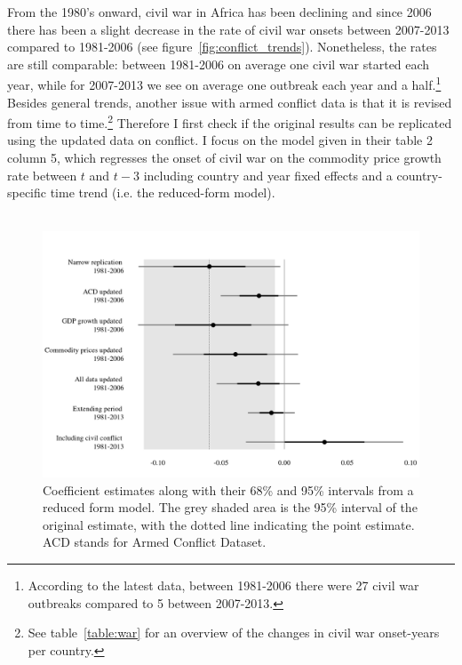 \documentclass[a4paper,11pt]{article}
\begin{document}
From the 1980's onward, civil war in Africa has been declining and since 2006 there has been a slight decrease in the rate of civil war onsets between 2007-2013 compared to 1981-2006 (see figure~\ref{fig:conflict_trends}). 
Nonetheless, the rates are still comparable: between 1981-2006 on average one civil war started each year, while for 2007-2013 we see on average one outbreak each year and a half.\footnote{According to the latest data, between 1981-2006 there were 27 civil war outbreaks compared to 5 between 2007-2013.}
Besides general trends, another issue with armed conflict data is that it is revised from time to time.\footnote{See table~\ref{table:war} for an overview of the changes in civil war onset-years per country.} 
Therefore I first check if the original results can be replicated using the updated data on conflict. 
I focus on the model given in their table 2 column 5, which regresses the onset of civil war on the commodity price growth rate between $t$ and $t-3$ including country and year fixed effects and a country-specific time trend (i.e. the reduced-form model).\\\\
\begin{figure}[!h]\centering
    \includegraphics[width=1\textwidth]{coefplot.png}
    \caption{Coefficient estimates along with their 68\% and 95\% intervals from a reduced form model. The grey shaded area is the 95\% interval of the original estimate, with the dotted line indicating the point estimate. ACD stands for Armed Conflict Dataset.}
    \label{fig:coefplot}
\end{figure}
\end{document}
